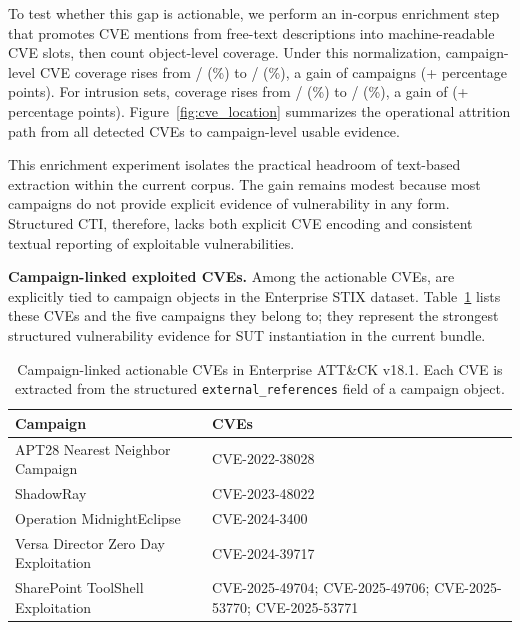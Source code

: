 \documentclass[sigconf,anonymous,review]{acmart}
\newcommand{\myparagraph}[1]{\textbf{#1.}\hspace{0.5em}}
\begin{document}
To test whether this gap is actionable, we perform an in-corpus enrichment step that promotes CVE mentions from free-text descriptions into machine-readable CVE slots, then count object-level coverage. Under this normalization, campaign-level CVE coverage rises from \entcampaignswithcvestructuredcount{}/\enterpriseactivecampaigncount{} (\entcampaignswithcvestructuredpct\%) to \entcampaignswithcvecount{}/\enterpriseactivecampaigncount{} (\entcampaignswithcvepct\%), a gain of \entcampaignswithcveenrichmentgaincount{} campaigns (+\entcampaignswithcveenrichmentgainpp{} percentage points). For intrusion sets, coverage rises from \entintrusionsetswithcvestructuredcount{}/\enterpriseactiveintrusionsetcount{} (\entintrusionsetswithcvestructuredpct\%) to \entintrusionsetswithcvecount{}/\enterpriseactiveintrusionsetcount{} (\entintrusionsetswithcvepct\%), a gain of \entintrusionsetswithcveenrichmentgaincount{} (+\entintrusionsetswithcveenrichmentgainpp{} percentage points). Figure~\ref{fig:cve_location} summarizes the operational attrition path from all detected CVEs to campaign-level usable evidence.

This enrichment experiment isolates the practical headroom of text-based extraction within the current corpus. The gain remains modest because most campaigns do not provide explicit evidence of vulnerability in any form. Structured CTI, therefore, lacks both explicit CVE encoding and consistent textual reporting of exploitable vulnerabilities.

\myparagraph{Campaign-linked exploited CVEs}
Among the \cveactionablecount{} actionable CVEs, \campaignlinkedcvecount{} are explicitly tied to campaign objects in the Enterprise STIX dataset. Table~\ref{tab:campaign_linked_cves} lists these CVEs and the five campaigns they belong to; they represent the strongest structured vulnerability evidence for SUT instantiation in the current bundle.

\begin{table}[!htb]
\caption{Campaign-linked actionable CVEs in Enterprise ATT\&CK v18.1. Each CVE is extracted from the structured \texttt{external\_references} field of a campaign object.}\label{tab:campaign_linked_cves}
\centering\small
\begin{tabular}{>{\raggedright\arraybackslash}p{4.2cm} >{\raggedright\arraybackslash}p{3.0cm}}
\toprule
\textbf{Campaign} & \textbf{CVEs} \\
\midrule
APT28 Nearest Neighbor Campaign & CVE-2022-38028 \\
ShadowRay & CVE-2023-48022 \\
Operation MidnightEclipse & CVE-2024-3400 \\
Versa Director Zero Day Exploitation & CVE-2024-39717 \\
SharePoint ToolShell Exploitation & CVE-2025-49704; CVE-2025-49706; CVE-2025-53770; CVE-2025-53771 \\
\bottomrule
\end{tabular}
\end{table}
\end{document}
